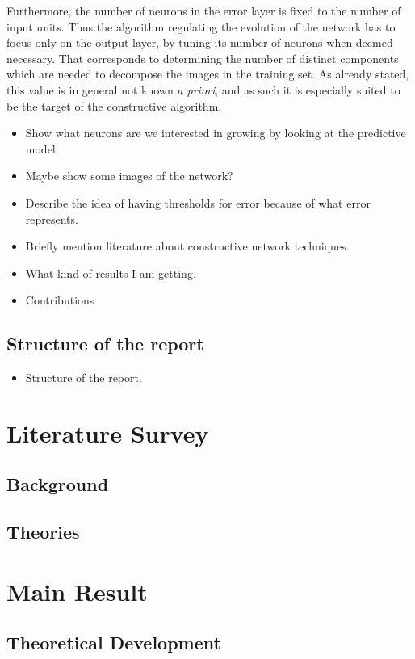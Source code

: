 \documentclass[11pt,a4paper]{report}
\begin{document}
		Furthermore, the number of neurons in the error layer is fixed to the number of input units. Thus the algorithm regulating the evolution of the network has to focus only on the output layer, by tuning its number of neurons when deemed necessary. That corresponds to determining the number of distinct components which are needed to decompose the images in the training set. As already stated, this value is in general not known \emph{a priori}, and as such it is especially suited to be the target of the constructive algorithm.

		\begin{itemize}
			\item Show what neurons are we interested in growing by looking at the predictive model.
			\item Maybe show some images of the network?
			\item Describe the idea of having thresholds for error because of what error represents.
			\item Briefly mention literature about constructive network techniques.
			\item What kind of results I am getting.
			\item Contributions
		\end{itemize}

		\section{Structure of the report}
		\begin{itemize}
			\item Structure of the report.
		\end{itemize}
	
	\chapter{Literature Survey}
		\section{Background}
		\section{Theories}
	
	\chapter{Main Result}
		\section{Theoretical Development}
\end{document}
